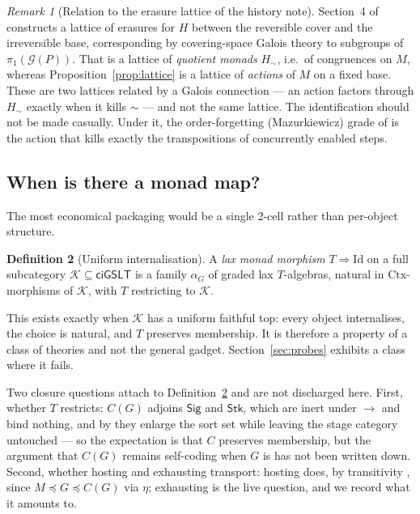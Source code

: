 \documentclass[11pt,a4paper]{article}
\theoremstyle{definition}
\newtheorem{definition}{Definition}[section]
\theoremstyle{plain}
\theoremstyle{remark}
\newtheorem{remark}[definition]{Remark}
\newcommand{\ciG}{\mathsf{ciGSLT}}
\newcommand{\CtxC}{\mathrm{Ctx}}
\newcommand{\Sig}{\mathsf{Sig}}
\newcommand{\Stk}{\mathsf{Stk}}
\begin{document}
\begin{remark}[Relation to the erasure lattice of the history note]
\label{rmk:galois}
Section~4 of \cite{history} constructs a lattice of erasures for $H$ between the reversible cover
and the irreversible base, corresponding by covering-space Galois theory to subgroups of
$\pi_1(\mathcal{G}(P))$. That is a lattice of \emph{quotient monads} $H_\sim$, i.e.\ of congruences
on $M$, whereas Proposition~\ref{prop:lattice} is a lattice of \emph{actions} of $M$ on a fixed base.
These are two lattices related by a Galois connection --- an action factors through $H_\sim$ exactly
when it kills $\sim$ --- and not the same lattice. The identification should not be made casually.
Under it, the order-forgetting (Mazurkiewicz) grade of \cite[Rmk.~4.3]{history} is the action that
kills exactly the transpositions of concurrently enabled steps.
\end{remark}

\subsection{When is there a monad map?}

The most economical packaging would be a single 2-cell rather than per-object structure.

\begin{definition}[Uniform internalisation]
\label{def:monad-map}
A \emph{lax monad morphism} $T \Rightarrow \mathrm{Id}$ on a full subcategory $\mathcal{K}
\subseteq \ciG$ is a family $\alpha_G$ of graded lax $T$-algebras, natural in
$\CtxC$-morphisms of $\mathcal{K}$, with $T$ restricting to $\mathcal{K}$.
\end{definition}

This exists exactly when $\mathcal{K}$ has a uniform faithful top: every object internalises, the
choice is natural, and $T$ preserves membership. It is therefore a property of a class of theories
and not the general gadget. Section~\ref{sec:probes} exhibits a class where it fails.

Two closure questions attach to Definition~\ref{def:monad-map} and are not discharged here. First,
whether $T$ restricts: $C(G)$ adjoins $\Sig$ and $\Stk$, which are inert under $\to$ and bind
nothing, and by \cite[Rmk.~3.7]{probe} they enlarge the sort set while leaving the stage category
untouched --- so the expectation is that $C$ preserves membership, but the argument that $C(G)$
remains self-coding when $G$ is has not been written down. Second, whether hosting and exhausting
transport: hosting does, by transitivity \cite[Prop.~4.7]{probe}, since
$M \preceq G \preceq C(G)$ via $\eta$; exhausting is the live question, and we record what it
amounts to.
\end{document}

